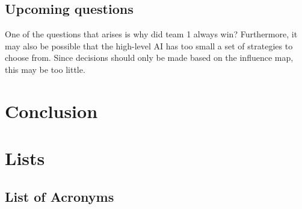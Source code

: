 \documentclass[]{report}
\begin{document}
		\section{Upcoming questions}
		One of the questions that arises is why did team 1 always win? Furthermore, it may also be possible that the high-level \ac{AI} has too small a set of strategies to choose from. Since decisions should only be made based on the influence map, this may be too little. 
		
		\chapter{Conclusion}
		
		
		\newpage
		\chapter{Lists}
		\section*{List of Acronyms}
		\begin{acronym}[FOW]
		\end{acronym}
		
		\listoffigures
		\listoftables
		
		
		
	
\end{document}
